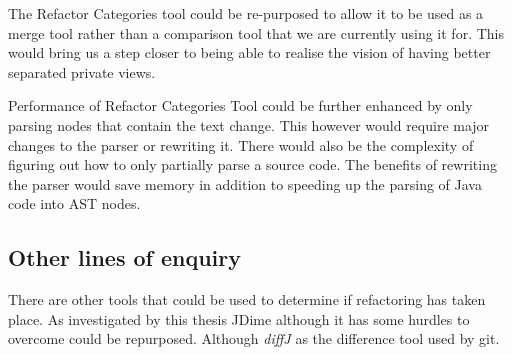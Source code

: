 The Refactor Categories tool could be re-purposed to allow it to be used as a merge tool rather than a comparison tool that we are currently using it for.  
This would bring us a step closer to being able to realise the vision of having better separated private views.  

Performance of Refactor Categories Tool could be further enhanced by only parsing nodes that contain the text change.  This however would require major changes to the parser or rewriting it. There would also be the complexity of figuring out how to only partially parse a source code. The benefits of rewriting the parser would save memory in addition to speeding up the parsing of Java code into AST nodes.


\subsection{Other lines of enquiry}

There are other tools that could be used to determine if refactoring has taken place.
As investigated by this thesis JDime although it has some hurdles to overcome could be repurposed.
Although \emph{diffJ} as the difference tool used by git.


% 
% 
% 
% 
% 
% 
